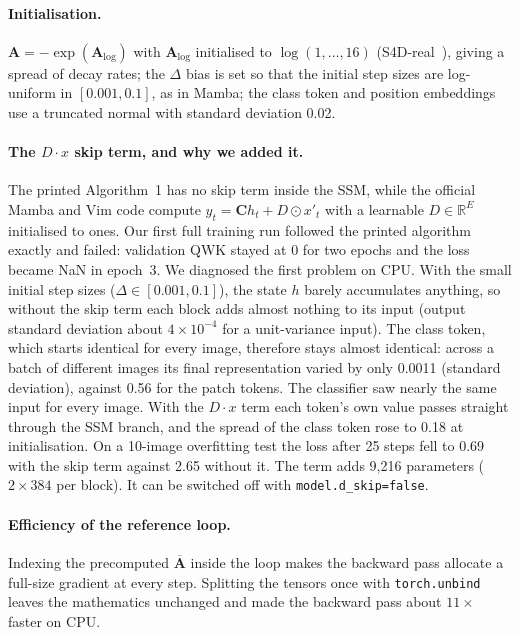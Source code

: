 \documentclass[11pt,a4paper]{article}
\begin{document}
\paragraph{Initialisation.} $\mathbf{A}=-\exp(\mathbf{A}_{\log})$ with
$\mathbf{A}_{\log}$ initialised to $\log(1,\dots,16)$ (S4D-real~\cite{gu2022s4d}),
giving a spread of decay rates; the $\Delta$ bias is set so that the initial step
sizes are log-uniform in $[0.001, 0.1]$, as in Mamba; the class token and position
embeddings use a truncated normal with standard deviation 0.02.

\paragraph{The $D\cdot x$ skip term, and why we added it.} The printed Algorithm~1
has no skip term inside the SSM, while the official Mamba and Vim code compute
$y_t = \mathbf{C}h_t + D\odot x'_t$ with a learnable $D\in\mathbb{R}^E$ initialised
to ones. Our first full training run followed the printed algorithm exactly and
failed: validation QWK stayed at 0 for two epochs and the loss became NaN in
epoch~3. We diagnosed the first problem on CPU. With the small initial step sizes
($\Delta\in[0.001,0.1]$), the state $h$ barely accumulates anything, so without the
skip term each block adds almost nothing to its input (output standard deviation
about $4\times10^{-4}$ for a unit-variance input). The class token, which starts
identical for every image, therefore stays almost identical: across a batch of
different images its final representation varied by only 0.0011 (standard
deviation), against 0.56 for the patch tokens. The classifier saw nearly the same
input for every image. With the $D\cdot x$ term each token's own value passes
straight through the SSM branch, and the spread of the class token rose to 0.18 at
initialisation. On a 10-image overfitting test the loss after 25 steps fell to 0.69
with the skip term against 2.65 without it. The term adds 9,216 parameters
($2\times384$ per block). It can be switched off with \texttt{model.d\_skip=false}.

\paragraph{Efficiency of the reference loop.} Indexing the precomputed
$\overline{\mathbf{A}}$ inside the loop makes the backward pass allocate a full-size
gradient at every step. Splitting the tensors once with \texttt{torch.unbind}
leaves the mathematics unchanged and made the backward pass about $11\times$ faster
on CPU.
\end{document}

